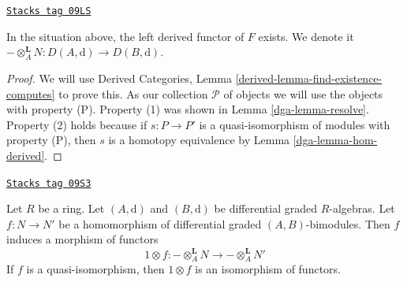 \begin{lemma}[Derived bc]
\label{dga-lemma-derived-bc}
\href{https://stacks.math.columbia.edu/tag/09LS}{\texttt{Stacks tag 09LS}}

In the situation above, the left derived functor of $F$ exists.
We denote it
$- \otimes_A^\mathbf{L} N : D(A, \text{d}) \to D(B, \text{d})$.
\end{lemma}

\begin{proof}

We will use
Derived Categories, Lemma \ref{derived-lemma-find-existence-computes}
to prove this. As our collection $\mathcal{P}$
of objects we will use the objects with property (P).
Property (1) was shown in Lemma \ref{dga-lemma-resolve}.
Property (2) holds because if $s : P \to P'$ is a quasi-isomorphism
of modules with property (P), then $s$ is a homotopy equivalence
by Lemma \ref{dga-lemma-hom-derived}.
\end{proof}

\begin{lemma}[Functoriality bc]
\label{dga-lemma-functoriality-bc}
\href{https://stacks.math.columbia.edu/tag/09S3}{\texttt{Stacks tag 09S3}}

Let $R$ be a ring. Let $(A, \text{d})$ and $(B, \text{d})$ be
differential graded $R$-algebras. Let $f : N \to N'$ be a
homomorphism of differential graded $(A, B)$-bimodules.
Then $f$ induces a morphism of functors
$$
1\otimes f :
- \otimes_A^\mathbf{L} N
\longrightarrow
- \otimes_A^\mathbf{L} N'
$$
If $f$ is a quasi-isomorphism, then $1 \otimes f$ is an isomorphism of
functors.
\end{lemma}

